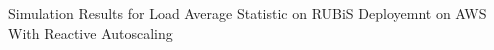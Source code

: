 \label{stratos} Simulation Results for Load Average Statistic on RUBiS Deployemnt on AWS With Reactive Autoscaling